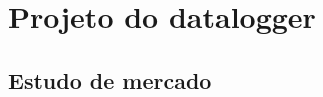 \chapter{Projeto do datalogger}
\label{chap:metodologia}





\section{Estudo de mercado}\label{sec:estudo_mercado}





